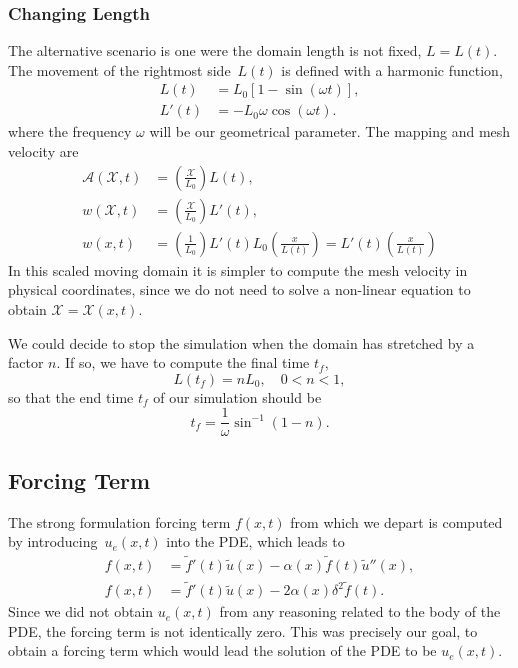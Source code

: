 \documentclass[../../main.tex]{subfiles}
\newcommand{\alemap}{\ensuremath{\mathcal{A}}}
\newcommand{\aleX}{\ensuremath{\mathcal{X}}}
\begin{document}
\subsubsection{Changing Length}
The alternative scenario is one were the domain length is not fixed, $L=L(t)$.
The movement of the rightmost side~$L(t)$ is defined with a harmonic function, 
\begin{subequations}
    \begin{align}
        L(t) &= L_0 \left[1 - \sin\left(\omega t\right)\right], \\
        L'(t) &= - L_0 \omega \cos(\omega t).
    \end{align}
\end{subequations}
where the frequency $\omega$ will be our geometrical parameter.
The mapping and mesh velocity are
\begin{subequations}
    \begin{align}
        \alemap(\aleX, t) &= \left(\frac{\aleX}{L_0}\right) L(t), \\
        w(\aleX, t) &= \left(\frac{\aleX}{L_0}\right) L'(t), \\
        w(x, t) &= \left(\frac{1}{L_0}\right) L'(t) {L_0} \left(\frac{x}{L(t)}\right) =
        L'(t)\left(\frac{x}{L(t)}\right)
    \end{align}
\end{subequations}
In this scaled moving domain it is simpler to compute the mesh velocity in physical coordinates, since we do not need to solve a non-linear equation to obtain $\aleX = \aleX(x,t)$. 

We could decide to stop the simulation when the domain has stretched by a factor $n$.
If so, we have to compute the final time $t_f$,
\begin{equation}
    L(t_f) = n L_0, \quad 0 < n < 1,
\end{equation}
so that the end time $t_f$ of our simulation should be
\begin{equation}
    t_f = \frac{1}{\omega} \sin^{-1}\left(1 - n\right).
\end{equation}

\subsection{Forcing Term}
The strong formulation forcing term $f(x,t)$ from which we depart is computed by introducing~$u_e(x,t)$ into the PDE, which leads to
\begin{subequations}
    \label{eq:1d_fom_mfp_forcing_term}
    \begin{align}
        f(x,t) &= \tilde{f}'(t) \tilde{u}(x) - \alpha(x) \tilde{f}(t) \tilde{u}''(x), \\
        f(x,t) &= \tilde{f}'(t) \tilde{u}(x) - 2 \alpha(x) \delta^2 \tilde{f}(t).
    \end{align}
\end{subequations}
Since we did not obtain $u_e(x,t)$ from any reasoning related to the body of the PDE, 
the forcing term is not identically zero.
This was precisely our goal, to obtain a forcing term which would lead the solution of the PDE to be $u_e(x,t)$. 
\end{document}
